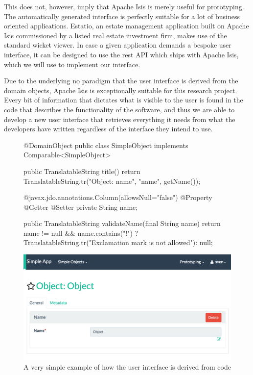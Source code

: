 This does not, however, imply that Apache Isis is merely useful for prototyping. The automatically generated interface is perfectly suitable for a lot of business oriented applications. Estatio\cite{Estat40:online}, an estate management application built on Apache Isis commissioned by a listed real estate investment firm, makes use of the standard wicket viewer. In case a given application demands a bespoke user interface, it can be designed to use the \acrshort{rest} API which ships with Apache Isis, which we will use to implement our interface.

Due to the underlying \acrshort{no} paradigm that the user interface is derived from the domain objects, Apache Isis is exceptionally suitable for this research project. Every bit of information that dictates what is visible to the user is found in the code that describes the functionality of the software, and thus we are able to develop a new user interface that retrieves everything it needs from what the developers have written regardless of the interface they intend to use.

\noindent
\begin{figure}
\begin{minipage}{.5\textwidth}
\begin{javacode}
@DomainObject
public class SimpleObject implements Comparable<SimpleObject> {
    public TranslatableString title() {
        return TranslatableString.tr("Object: {name}", "name", getName());
    }

    @javax.jdo.annotations.Column(allowsNull="false")
    @Property
    @Getter @Setter
    private String name;

    public TranslatableString validateName(final String name) {
        return name != null && name.contains("!") ?
            TranslatableString.tr("Exclamation mark is not allowed"): null;
    }
}
\end{javacode}
\end{minipage}
\begin{minipage}{.5\textwidth}
	\includegraphics[width=\textwidth]{figures/simpleobjectui}
\end{minipage}
\caption{A very simple example of how the user interface is derived from code}
\end{figure}

